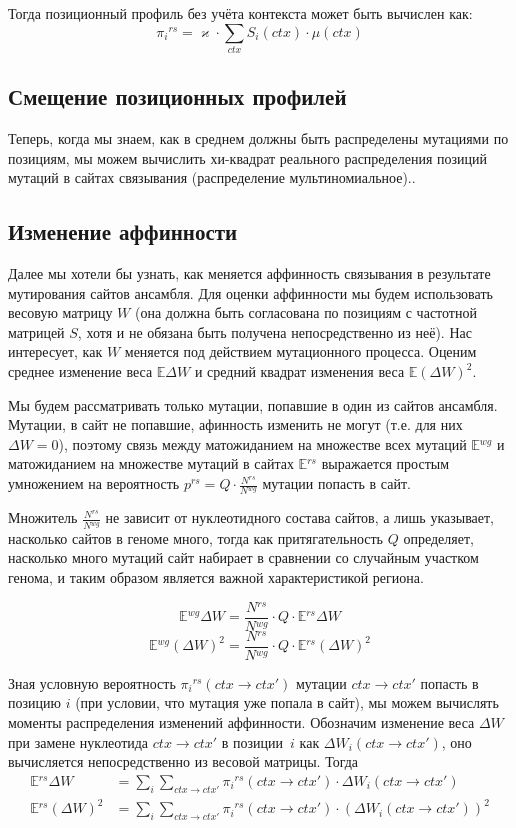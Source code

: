 \documentclass[a4paper]{article}
\newcommand\wg{{}^{wg}}
\newcommand\rs{{}^{rs}}
\newcommand\sumctx{\sum_{ctx}}
\newcommand\dirctx{ctx\to ctx'}
\newcommand\sumdirctx{\sum_{\dirctx}}
\begin{document}
Тогда позиционный профиль без учёта контекста может быть вычислен как:
\begin{equation}
\pi_i\rs = \varkappa\cdot \sumctx S_i(ctx)\cdot\mu(ctx)
\end{equation}

\subsection{Смещение позиционных профилей}
Теперь, когда мы знаем, как в среднем должны быть распределены мутациями по позициям, мы можем вычислить хи-квадрат реального распределения позиций мутаций в сайтах связывания (распределение мультиномиальное)..

\subsection*{Изменение аффинности}
Далее мы хотели бы узнать, как меняется аффинность связывания в результате мутирования сайтов ансамбля. Для оценки аффинности мы будем использовать весовую матрицу $W$ (она должна быть согласована по позициям с частотной матрицей $S$, хотя и не обязана быть получена непосредственно из неё). Нас интересует, как $W$ меняется под действием мутационного процесса.
Оценим среднее изменение веса $\mathbb{E}\Delta W$ и средний квадрат изменения веса $\mathbb{E}(\Delta W)^2$.

Мы будем рассматривать только мутации, попавшие в один из сайтов ансамбля. Мутации, в сайт не попавшие, афинность изменить не могут (т.е. для них $\Delta W=0$), поэтому связь между матожиданием на множестве всех мутаций $\mathbb{E}\wg$ и матожиданием на множестве мутаций в сайтах $\mathbb{E}\rs$ выражается простым умножением на вероятность $p\rs=Q\cdot\frac{N\rs}{N\wg}$ мутации попасть в сайт.

Множитель $\frac{N\rs}{N\wg}$ не зависит от нуклеотидного состава сайтов, а лишь указывает, насколько сайтов в геноме много, тогда как притягательность $Q$ определяет, насколько много мутаций сайт набирает в сравнении со случайным участком генома, и таким образом является важной характеристикой региона.

$$\mathbb{E}\wg\Delta W = \frac{N\rs}{N\wg}\cdot Q\cdot\mathbb{E}\rs\Delta W$$
$$\mathbb{E}\wg(\Delta W)^2 = \frac{N\rs}{N\wg}\cdot Q\cdot\mathbb{E}\rs\left(\Delta W\right)^2$$

Зная условную вероятность $\pi_i\rs(\dirctx)$ мутации $\dirctx$ попасть в позицию $i$ (при условии, что мутация уже попала в сайт), мы можем вычислять моменты распределения изменений аффинности.
Обозначим изменение веса $\Delta W$ при замене нуклеотида $\dirctx$ в позиции~$i$ как $\Delta W_i(\dirctx)$, оно вычисляется непосредственно из весовой матрицы. Тогда
\begin{align}
\mathbb{E}\rs\Delta W &= \sum_i\sumdirctx \pi_i\rs(\dirctx)\cdot\Delta W_i(\dirctx)\\
\mathbb{E}\rs(\Delta W)^2 &= \sum_i\sumdirctx \pi_i\rs(\dirctx)\cdot\left(\Delta W_i(\dirctx)\right)^2
\end{align}
\end{document}
